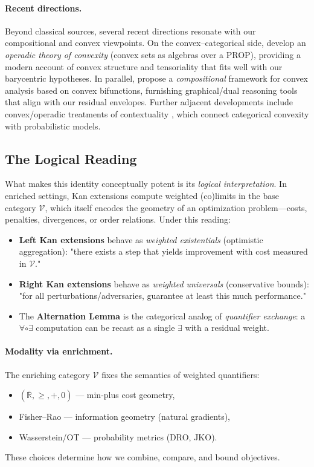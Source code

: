 \documentclass[11pt]{article}
\numberwithin{equation}{section}
\theoremstyle{upright}
\newcommand{\V}{\mathcal{V}}
\begin{document}
\paragraph{Recent directions.}
Beyond classical sources, several recent directions resonate with our compositional
and convex viewpoints.  On the convex–categorical side, \citet{HaderiOkayStern2024}
develop an \emph{operadic theory of convexity} (convex sets as algebras over a PROP),
providing a modern account of convex structure and tensoriality that fits well with our
barycentric hypotheses.  In parallel, \citet{Stein2023} propose a \emph{compositional}
framework for convex analysis based on convex bifunctions, furnishing graphical/dual
reasoning tools that align with our residual envelopes. Further adjacent developments include convex/operadic treatments of contextuality
\citep{Kharoof2022}, which connect categorical convexity with probabilistic models.


\subsection{The Logical Reading}

What makes this identity conceptually potent is its \emph{logical interpretation}. In enriched settings, Kan extensions compute weighted (co)limits in the base category $\V$, which itself encodes the geometry of an optimization problem—costs, penalties, divergences, or order relations. Under this reading:
\begin{itemize}[itemsep=0.5ex]
\item \textbf{Left Kan extensions} behave as \emph{weighted existentials} (optimistic aggregation): "there exists a step that yields improvement with cost measured in $\V$."
\item \textbf{Right Kan extensions} behave as \emph{weighted universals} (conservative bounds): "for all perturbations/adversaries, guarantee at least this much performance."
\item The \textbf{Alternation Lemma} is the categorical analog of \emph{quantifier exchange}: a $\forall\circ\exists$ computation can be recast as a single $\exists$ with a residual weight.
\end{itemize}

\paragraph{Modality via enrichment.}
The enriching category $\V$ fixes the semantics of weighted quantifiers:
\begin{itemize}[itemsep=0.25ex]
\item $(\overline{\mathbb R},\ge,+,0)$ --- min-plus cost geometry,
\item Fisher--Rao --- information geometry (natural gradients),
\item Wasserstein/OT --- probability metrics (DRO, JKO).
\end{itemize}
These choices determine how we combine, compare, and bound objectives.
\end{document}
